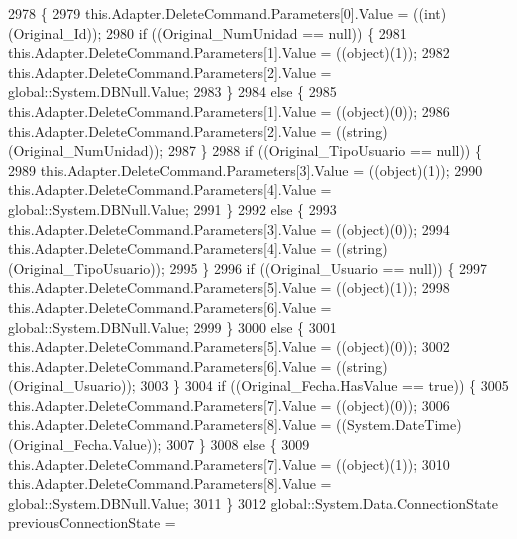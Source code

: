\begin{DoxyCode}
2978                                                                                                            
                                                                                            \{
2979             this.Adapter.DeleteCommand.Parameters[0].Value = ((int)(Original\_Id));
2980             \textcolor{keywordflow}{if} ((Original\_NumUnidad == null)) \{
2981                 this.Adapter.DeleteCommand.Parameters[1].Value = ((object)(1));
2982                 this.Adapter.DeleteCommand.Parameters[2].Value = global::System.DBNull.Value;
2983             \}
2984             \textcolor{keywordflow}{else} \{
2985                 this.Adapter.DeleteCommand.Parameters[1].Value = ((object)(0));
2986                 this.Adapter.DeleteCommand.Parameters[2].Value = ((string)(Original\_NumUnidad));
2987             \}
2988             \textcolor{keywordflow}{if} ((Original\_TipoUsuario == null)) \{
2989                 this.Adapter.DeleteCommand.Parameters[3].Value = ((object)(1));
2990                 this.Adapter.DeleteCommand.Parameters[4].Value = global::System.DBNull.Value;
2991             \}
2992             \textcolor{keywordflow}{else} \{
2993                 this.Adapter.DeleteCommand.Parameters[3].Value = ((object)(0));
2994                 this.Adapter.DeleteCommand.Parameters[4].Value = ((string)(Original\_TipoUsuario));
2995             \}
2996             \textcolor{keywordflow}{if} ((Original\_Usuario == null)) \{
2997                 this.Adapter.DeleteCommand.Parameters[5].Value = ((object)(1));
2998                 this.Adapter.DeleteCommand.Parameters[6].Value = global::System.DBNull.Value;
2999             \}
3000             \textcolor{keywordflow}{else} \{
3001                 this.Adapter.DeleteCommand.Parameters[5].Value = ((object)(0));
3002                 this.Adapter.DeleteCommand.Parameters[6].Value = ((string)(Original\_Usuario));
3003             \}
3004             \textcolor{keywordflow}{if} ((Original\_Fecha.HasValue == \textcolor{keyword}{true})) \{
3005                 this.Adapter.DeleteCommand.Parameters[7].Value = ((object)(0));
3006                 this.Adapter.DeleteCommand.Parameters[8].Value = ((System.DateTime)(Original\_Fecha.Value));
3007             \}
3008             \textcolor{keywordflow}{else} \{
3009                 this.Adapter.DeleteCommand.Parameters[7].Value = ((object)(1));
3010                 this.Adapter.DeleteCommand.Parameters[8].Value = global::System.DBNull.Value;
3011             \}
3012             global::System.Data.ConnectionState previousConnectionState = 

\end{DoxyCode}

